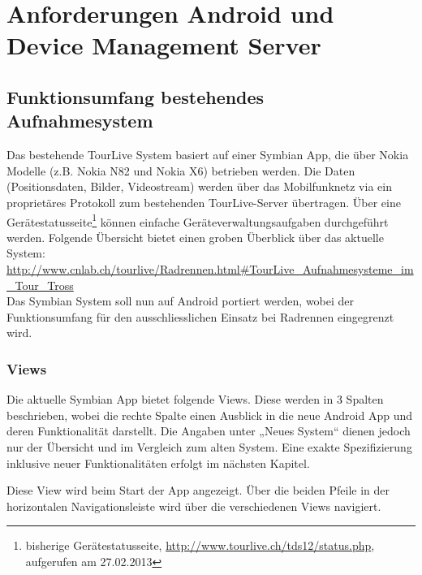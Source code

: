 \newpage
\section{Anforderungen Android und Device Management Server}
\label{sec:anforderungenandroiddevmgmt}

\subsection{Funktionsumfang bestehendes Aufnahmesystem}
Das bestehende TourLive System basiert auf einer Symbian App, die über Nokia Modelle (z.B. Nokia N82 und Nokia X6) betrieben werden. Die Daten (Positionsdaten, Bilder, Videostream) werden über das Mobilfunknetz via ein proprietäres Protokoll zum bestehenden TourLive-Server übertragen. Über eine Gerätestatusseite\footnote{bisherige Gerätestatusseite, \url{http://www.tourlive.ch/tds12/status.php}, aufgerufen am 27.02.2013}   können einfache Geräteverwaltungsaufgaben durchgeführt werden. Folgende Übersicht bietet einen groben Überblick über das aktuelle System: \url{
http://www.cnlab.ch/tourlive/Radrennen.html#TourLive_Aufnahmesysteme_im_Tour_Tross} \\

Das Symbian System soll nun auf Android portiert werden, wobei der Funktionsumfang für den ausschliesslichen Einsatz bei Radrennen eingegrenzt wird. 

\subsubsection{Views}
Die aktuelle Symbian App bietet folgende Views. Diese werden in 3 Spalten beschrieben, wobei die rechte Spalte einen Ausblick in die neue Android App und deren Funktionalität darstellt. Die Angaben unter „Neues System“ dienen jedoch nur der Übersicht und im Vergleich zum alten System. Eine exakte Spezifizierung inklusive neuer Funktionalitäten erfolgt im nächsten Kapitel.

Diese View wird beim Start der App angezeigt. Über die beiden Pfeile in der horizontalen Navigationsleiste wird über die verschiedenen Views navigiert.

